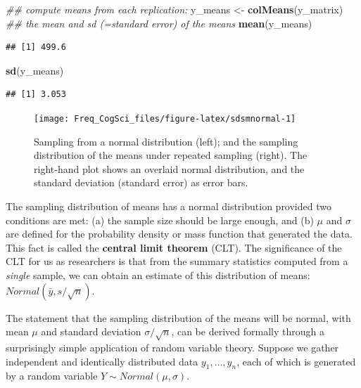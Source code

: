 \documentclass[12pt,]{krantz}
\newenvironment{Shaded}{\begin{snugshade}}{\end{snugshade}}
\newcommand{\CommentTok}[1]{\textcolor[rgb]{0.56,0.35,0.01}{\textit{#1}}}
\newcommand{\KeywordTok}[1]{\textcolor[rgb]{0.13,0.29,0.53}{\textbf{#1}}}
\newcommand{\NormalTok}[1]{#1}
\newcommand{\StringTok}[1]{\textcolor[rgb]{0.31,0.60,0.02}{#1}}
\begin{document}
\begin{Shaded}
\begin{Highlighting}[]
\CommentTok{## compute means from each replication:}
\NormalTok{y_means <-}\StringTok{ }\KeywordTok{colMeans}\NormalTok{(y_matrix)}
\CommentTok{## the mean and sd (=standard error) of the means}
\KeywordTok{mean}\NormalTok{(y_means)}
\end{Highlighting}
\end{Shaded}

\begin{verbatim}
## [1] 499.6
\end{verbatim}

\begin{Shaded}
\begin{Highlighting}[]
\KeywordTok{sd}\NormalTok{(y_means)}
\end{Highlighting}
\end{Shaded}

\begin{verbatim}
## [1] 3.053
\end{verbatim}

\begin{figure}
\texttt{[image: Freq\_CogSci\_files/figure-latex/sdsmnormal-1]} \caption{Sampling from a normal distribution (left); and the sampling distribution of the means under repeated sampling (right). The right-hand plot shows an overlaid normal distribution, and the standard deviation (standard error) as error bars.}\label{fig:sdsmnormal}
\end{figure}

The sampling distribution of means has a normal distribution provided two conditions are met: (a) the sample size should be large enough, and (b) \(\mu\) and \(\sigma\) are defined for the probability density or mass function that generated the data. This fact is called the \textbf{central limit theorem} (CLT). The significance of the CLT for us as researchers is that from the summary statistics computed from a \emph{single} sample, we can obtain an estimate of this distribution of means: \(Normal(\bar{y},s/\sqrt{n})\).

The statement that the sampling distribution of the means will be normal, with mean \(\mu\) and standard deviation \(\sigma/\sqrt{n}\), can be derived formally through a surprisingly simple application of random variable theory. Suppose we gather independent and identically distributed data \(y_1, \dots, y_n\), each of which is generated by a random variable \(Y\sim Normal(\mu,\sigma)\).
\end{document}
